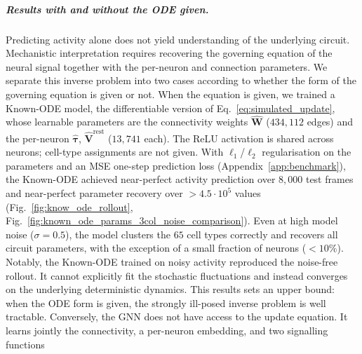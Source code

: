 \documentclass{article}
\begin{document}

\subparagraph{Results with and without the ODE given.}
Predicting activity alone does not yield understanding of the underlying
circuit. Mechanistic interpretation requires recovering the governing
equation of the neural signal together with the per-neuron and
connection parameters. We separate this inverse problem into two cases
according to whether the form of the governing equation is given or not.
When the equation is given, we trained a Known-ODE model, the
differentiable version of Eq.~\ref{eq:simulated_update}, whose
learnable parameters are the connectivity weights $\hat{\mathbf{W}}$
($434{,}112$ edges) and the per-neuron $\hat{\boldsymbol{\tau}}$,
$\hat{\mathbf{V}}^{\mathrm{rest}}$ ($13{,}741$ each). The ReLU
activation is shared across neurons; cell-type assignments are not
given. With $\ell_1$/$\ell_2$ regularisation on the parameters and an MSE
one-step prediction loss (Appendix~\ref{app:benchmark}), the Known-ODE
achieved near-perfect activity prediction over $8{,}000$ test frames
and near-perfect parameter recovery over $>4.5\cdot10^5$ values  (Fig.~\ref{fig:know_ode_rollout},
Fig.~\ref{fig:known_ode_params_3col_noise_comparison}). Even at high model noise ($\sigma=0.5$), the model clusters the $65$
cell types correctly and recovers all circuit parameters, with the
exception of a small fraction of neurons ($<10\%$). Notably, the Known-ODE trained on
noisy activity reproduced the noise-free rollout. It cannot
explicitly fit the stochastic fluctuations and instead converges on the
underlying deterministic dynamics. This results sets an upper bound: when the
ODE form is given, the strongly ill-posed inverse problem is well tractable.
Conversely, the GNN does not have access to the update equation. It learns jointly
the connectivity, a per-neuron embedding, and two signalling functions
\end{document}
